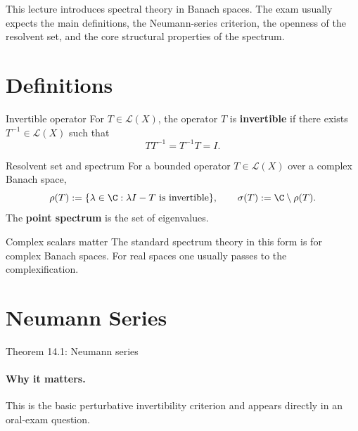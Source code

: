 \documentclass[11pt]{article}
\begin{document}

\vspace{0.8em}

\begin{focusbox}
This lecture introduces spectral theory in Banach spaces. The exam usually expects the main definitions, the Neumann-series criterion, the openness of the resolvent set, and the core structural properties of the spectrum.
\end{focusbox}

\tableofcontents

\section{Definitions}

\begin{defbox}{Invertible operator}
For $T\in\mathcal L(X)$, the operator $T$ is \textbf{invertible} if there exists $T^{-1}\in\mathcal L(X)$ such that
\[
TT^{-1}=T^{-1}T=I.
\]
\end{defbox}

\begin{defbox}{Resolvent set and spectrum}
For a bounded operator $T\in\mathcal L(X)$ over a complex Banach space,
\[
\rho(T):=\{\lambda\in\C : \lambda I-T \text{ is invertible}\},
\qquad
\sigma(T):=\C\setminus \rho(T).
\]
The \textbf{point spectrum} is the set of eigenvalues.
\end{defbox}

\begin{warningbox}{Complex scalars matter}
The standard spectrum theory in this form is for complex Banach spaces. For real spaces one usually passes to the complexification.
\end{warningbox}

\section{Neumann Series}

\begin{thmbox}{Theorem 14.1: Neumann series}
\thmNeumannSeries
\end{thmbox}

\paragraph{Why it matters.}
This is the basic perturbative invertibility criterion and appears directly in an oral-exam question.
\end{document}
